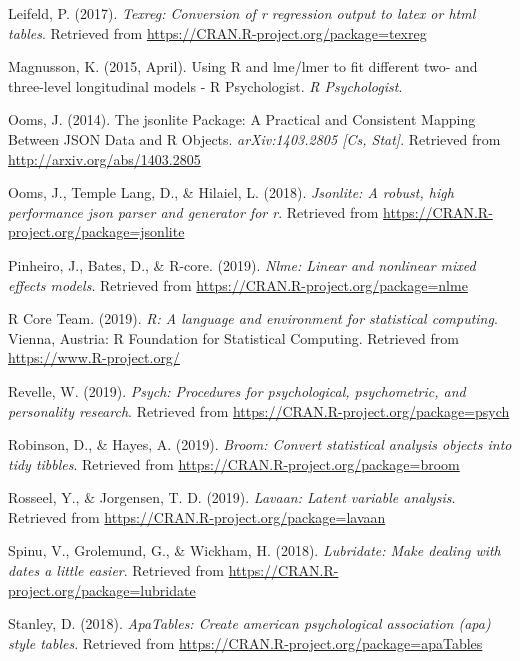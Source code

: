 \documentclass[doc,floatsintext]{apa6}
\begin{document}
\hypertarget{ref-R-texreg}{}
Leifeld, P. (2017). \emph{Texreg: Conversion of r regression output to
latex or html tables}. Retrieved from
\url{https://CRAN.R-project.org/package=texreg}

\hypertarget{ref-magnussonUsingLmeLmer2015}{}
Magnusson, K. (2015, April). Using R and lme/lmer to fit different two-
and three-level longitudinal models - R Psychologist. \emph{R
Psychologist}.

\hypertarget{ref-oomsJsonlitePackagePractical2014}{}
Ooms, J. (2014). The jsonlite Package: A Practical and Consistent
Mapping Between JSON Data and R Objects. \emph{arXiv:1403.2805 {[}Cs,
Stat{]}}. Retrieved from \url{http://arxiv.org/abs/1403.2805}

\hypertarget{ref-R-jsonlite}{}
Ooms, J., Temple Lang, D., \& Hilaiel, L. (2018). \emph{Jsonlite: A
robust, high performance json parser and generator for r}. Retrieved
from \url{https://CRAN.R-project.org/package=jsonlite}

\hypertarget{ref-R-nlme}{}
Pinheiro, J., Bates, D., \& R-core. (2019). \emph{Nlme: Linear and
nonlinear mixed effects models}. Retrieved from
\url{https://CRAN.R-project.org/package=nlme}

\hypertarget{ref-R-base}{}
R Core Team. (2019). \emph{R: A language and environment for statistical
computing}. Vienna, Austria: R Foundation for Statistical Computing.
Retrieved from \url{https://www.R-project.org/}

\hypertarget{ref-R-psych}{}
Revelle, W. (2019). \emph{Psych: Procedures for psychological,
psychometric, and personality research}. Retrieved from
\url{https://CRAN.R-project.org/package=psych}

\hypertarget{ref-R-broom}{}
Robinson, D., \& Hayes, A. (2019). \emph{Broom: Convert statistical
analysis objects into tidy tibbles}. Retrieved from
\url{https://CRAN.R-project.org/package=broom}

\hypertarget{ref-R-lavaan}{}
Rosseel, Y., \& Jorgensen, T. D. (2019). \emph{Lavaan: Latent variable
analysis}. Retrieved from
\url{https://CRAN.R-project.org/package=lavaan}

\hypertarget{ref-R-lubridate}{}
Spinu, V., Grolemund, G., \& Wickham, H. (2018). \emph{Lubridate: Make
dealing with dates a little easier}. Retrieved from
\url{https://CRAN.R-project.org/package=lubridate}

\hypertarget{ref-R-apaTables}{}
Stanley, D. (2018). \emph{ApaTables: Create american psychological
association (apa) style tables}. Retrieved from
\url{https://CRAN.R-project.org/package=apaTables}
\end{document}
